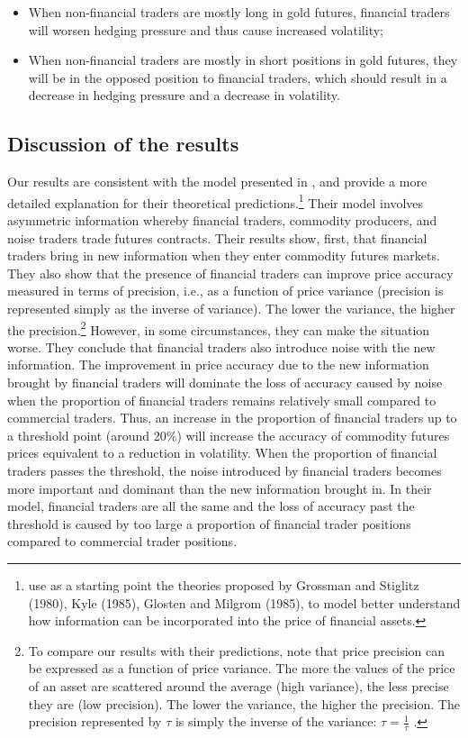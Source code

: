 \documentclass[12pt]{article}
\begin{document}
\begin{itemize}
\item When non-financial traders are mostly long in  gold futures, financial traders will worsen  hedging pressure  and thus cause increased volatility;
\item When non-financial traders are mostly in short positions in gold futures, they will be in the opposed position to financial traders, which should result in a decrease in hedging pressure and a decrease in volatility.
\end{itemize}


\subsection{Discussion of the results}%
Our results are consistent with the model presented in \citet{goldstein2019commodity}, and provide a more detailed explanation for their theoretical predictions.\footnote{\citet{goldstein2019commodity} use as a starting point the theories proposed by Grossman and Stiglitz (1980), Kyle (1985), Glosten and Milgrom (1985), to model better understand how information can be incorporated into the price of financial assets.} 
Their model involves asymmetric information whereby financial traders, commodity producers, and noise traders trade futures contracts. Their results show, first, that financial traders bring in new information when they enter  commodity futures markets. They also  show that the presence of financial traders can improve price accuracy measured in terms of precision, i.e., as a function of price variance (precision is represented simply as the inverse of variance). The lower the variance, the higher the precision.\footnote{To compare our results with their predictions, note that price  precision can be expressed as a function of price  variance. The more the values of the price of an asset are scattered around the average (high variance), the less precise they are (low precision).  The lower the variance, the higher the precision. The precision represented by $\tau$ is simply the inverse of the variance: $\tau=\frac{1}{\tau}$ .} However, in some circumstances, they can make the situation worse. They conclude that financial traders also introduce noise with the new information. The improvement in price accuracy due to the new information brought by financial traders will dominate the loss of accuracy caused by noise when the proportion of financial traders remains relatively small compared to commercial traders. Thus, an increase in the proportion of financial traders up to a threshold point (around 20\%) will increase the accuracy of commodity futures prices equivalent to a reduction in volatility. When the proportion of financial traders passes the threshold, the noise introduced by financial traders becomes more important and dominant than the new information brought in.
In their model, financial traders are all the same and the loss of accuracy past the threshold is caused by too large a proportion of financial trader positions compared to commercial trader positions. 
\end{document}
